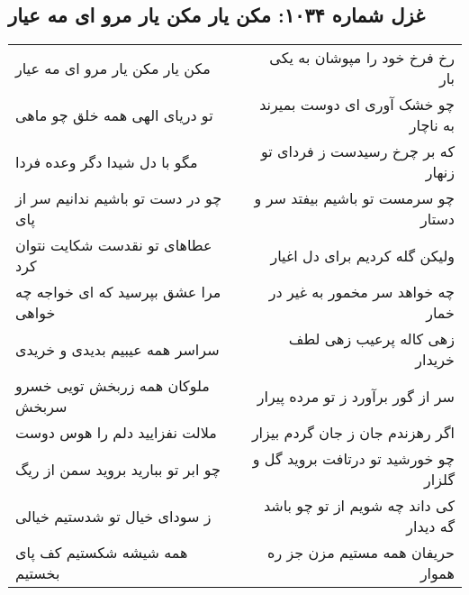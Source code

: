 \begin{center}
\section*{غزل شماره ۱۰۳۴: مکن یار مکن یار مرو ای مه عیار}
\label{sec:1034}
\begin{longtable}{l p{0.5cm} r}
مکن یار مکن یار مرو ای مه عیار
&&
رخ فرخ خود را مپوشان به یکی بار
\\
تو دریای الهی همه خلق چو ماهی
&&
چو خشک آوری ای دوست بمیرند به ناچار
\\
مگو با دل شیدا دگر وعده فردا
&&
که بر چرخ رسیدست ز فردای تو زنهار
\\
چو در دست تو باشیم ندانیم سر از پای
&&
چو سرمست تو باشیم بیفتد سر و دستار
\\
عطاهای تو نقدست شکایت نتوان کرد
&&
ولیکن گله کردیم برای دل اغیار
\\
مرا عشق بپرسید که ای خواجه چه خواهی
&&
چه خواهد سر مخمور به غیر در خمار
\\
سراسر همه عیبیم بدیدی و خریدی
&&
زهی کاله پرعیب زهی لطف خریدار
\\
ملوکان همه زربخش تویی خسرو سربخش
&&
سر از گور برآورد ز تو مرده پیرار
\\
ملالت نفزایید دلم را هوس دوست
&&
اگر رهزندم جان ز جان گردم بیزار
\\
چو ابر تو ببارید بروید سمن از ریگ
&&
چو خورشید تو درتافت بروید گل و گلزار
\\
ز سودای خیال تو شدستیم خیالی
&&
کی داند چه شویم از تو چو باشد گه دیدار
\\
همه شیشه شکستیم کف پای بخستیم
&&
حریفان همه مستیم مزن جز ره هموار
\\
\end{longtable}
\end{center}
